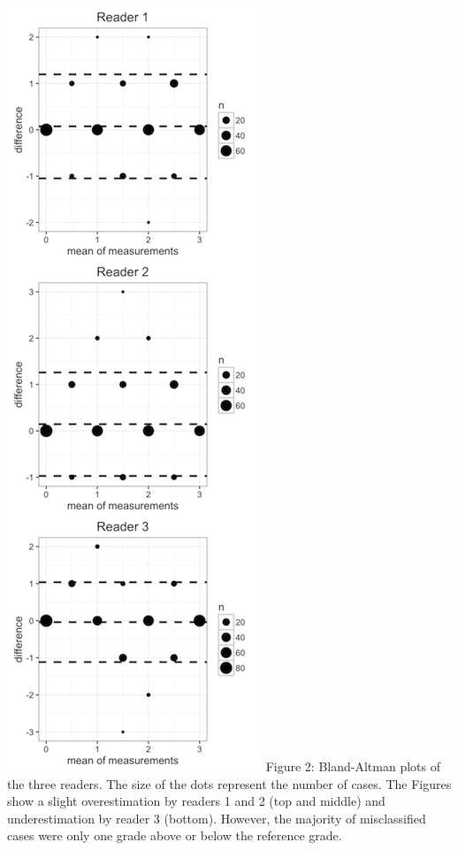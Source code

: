 \documentclass[]{elsarticle} %
\makeatletter
\def\maxwidth{\ifdim\Gin@nat@width>\linewidth\linewidth
\else\Gin@nat@width\fi}
\let\Oldincludegraphics\includegraphics
\renewcommand{\includegraphics}[1]{\Oldincludegraphics[width=\maxwidth]{#1}}
\makeatother
\begin{document}
\includegraphics{Figure_BlandAltman.png} Figure 2: Bland-Altman plots of
the three readers. The size of the dots represent the number of cases.
The Figures show a slight overestimation by readers 1 and 2 (top and
middle) and underestimation by reader 3 (bottom). However, the majority
of misclassified cases were only one grade above or below the reference
grade.

\pagebreak
\end{document}
